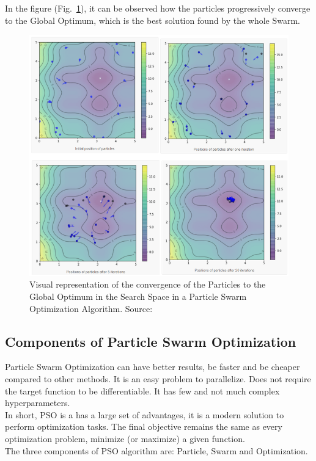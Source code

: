 In the figure (Fig.~\ref{fig:figure-3.1.1}), it can be observed how the particles progressively converge to the Global Optimum, which is the best solution found by the whole Swarm.
\begin{figure}[t]
	\centering
	\includegraphics[width=14cm]{figures/figure-3.1.1.png}
	\caption[Visual Representation of Particle Swarm Optimization]{Visual representation of the convergence of the Particles to the Global Optimum in the Search Space in a Particle Swarm Optimization Algorithm. Source:~\cite{Tesi-3.1}}
	\label{fig:figure-3.1.1}
\end{figure}

\subsection{Components of Particle Swarm Optimization}

Particle Swarm Optimization can have better results, be faster and be cheaper compared to other methods. It is an easy problem to parallelize. Does not require the target function to be differentiable. It has few and not much complex hyperparameters.
\\[0.3cm]In short, PSO is a has a large set of advantages, it is a modern solution to perform optimization tasks. The final objective remains the same as every optimization problem, minimize (or maximize) a given function.
\\[0.3cm]The three components of PSO algorithm are: Particle, Swarm and Optimization.

